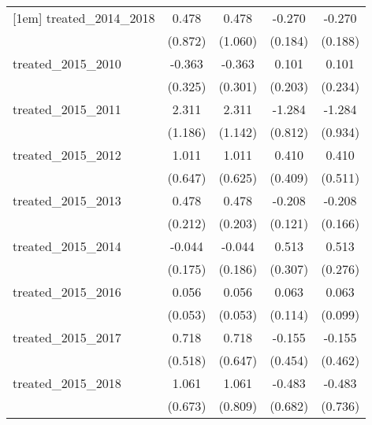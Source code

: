 {\begin{tabular}{l*{4}{c}}
[1em]
treated\_2014\_2018&       0.478         &       0.478         &      -0.270         &      -0.270         \\
            &     (0.872)         &     (1.060)         &     (0.184)         &     (0.188)         \\
[1em]
treated\_2015\_2010&      -0.363         &      -0.363         &       0.101         &       0.101         \\
            &     (0.325)         &     (0.301)         &     (0.203)         &     (0.234)         \\
[1em]
treated\_2015\_2011&       2.311         &       2.311\sym{*}  &      -1.284         &      -1.284         \\
            &     (1.186)         &     (1.142)         &     (0.812)         &     (0.934)         \\
[1em]
treated\_2015\_2012&       1.011         &       1.011         &       0.410         &       0.410         \\
            &     (0.647)         &     (0.625)         &     (0.409)         &     (0.511)         \\
[1em]
treated\_2015\_2013&       0.478\sym{*}  &       0.478\sym{*}  &      -0.208         &      -0.208         \\
            &     (0.212)         &     (0.203)         &     (0.121)         &     (0.166)         \\
[1em]
treated\_2015\_2014&      -0.044         &      -0.044         &       0.513         &       0.513         \\
            &     (0.175)         &     (0.186)         &     (0.307)         &     (0.276)         \\
[1em]
treated\_2015\_2016&       0.056         &       0.056         &       0.063         &       0.063         \\
            &     (0.053)         &     (0.053)         &     (0.114)         &     (0.099)         \\
[1em]
treated\_2015\_2017&       0.718         &       0.718         &      -0.155         &      -0.155         \\
            &     (0.518)         &     (0.647)         &     (0.454)         &     (0.462)         \\
[1em]
treated\_2015\_2018&       1.061         &       1.061         &      -0.483         &      -0.483         \\
            &     (0.673)         &     (0.809)         &     (0.682)         &     (0.736)         \\

\end{tabular}}
